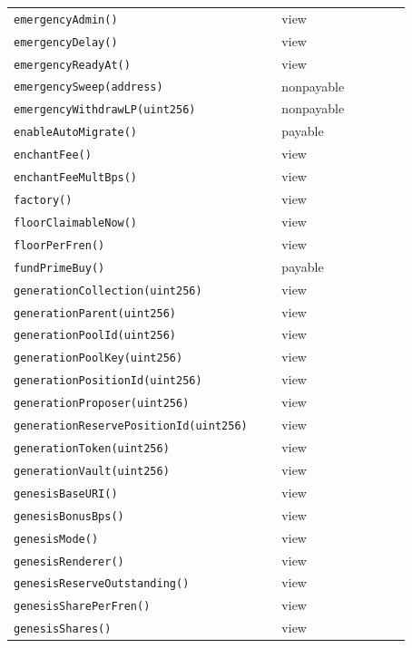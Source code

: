 \begin{longtable}{@{}p{0.62\linewidth}p{0.30\linewidth}@{}}
\texttt{\scriptsize emergencyAdmin()} & view \\
\texttt{\scriptsize emergencyDelay()} & view \\
\texttt{\scriptsize emergencyReadyAt()} & view \\
\texttt{\scriptsize emergencySweep(address)} & nonpayable \\
\texttt{\scriptsize emergencyWithdrawLP(uint256)} & nonpayable \\
\texttt{\scriptsize enableAutoMigrate()} & payable \\
\texttt{\scriptsize enchantFee()} & view \\
\texttt{\scriptsize enchantFeeMultBps()} & view \\
\texttt{\scriptsize factory()} & view \\
\texttt{\scriptsize floorClaimableNow()} & view \\
\texttt{\scriptsize floorPerFren()} & view \\
\texttt{\scriptsize fundPrimeBuy()} & payable \\
\texttt{\scriptsize generationCollection(uint256)} & view \\
\texttt{\scriptsize generationParent(uint256)} & view \\
\texttt{\scriptsize generationPoolId(uint256)} & view \\
\texttt{\scriptsize generationPoolKey(uint256)} & view \\
\texttt{\scriptsize generationPositionId(uint256)} & view \\
\texttt{\scriptsize generationProposer(uint256)} & view \\
\texttt{\scriptsize generationReservePositionId(uint256)} & view \\
\texttt{\scriptsize generationToken(uint256)} & view \\
\texttt{\scriptsize generationVault(uint256)} & view \\
\texttt{\scriptsize genesisBaseURI()} & view \\
\texttt{\scriptsize genesisBonusBps()} & view \\
\texttt{\scriptsize genesisMode()} & view \\
\texttt{\scriptsize genesisRenderer()} & view \\
\texttt{\scriptsize genesisReserveOutstanding()} & view \\
\texttt{\scriptsize genesisSharePerFren()} & view \\
\texttt{\scriptsize genesisShares()} & view \\

\end{longtable}
